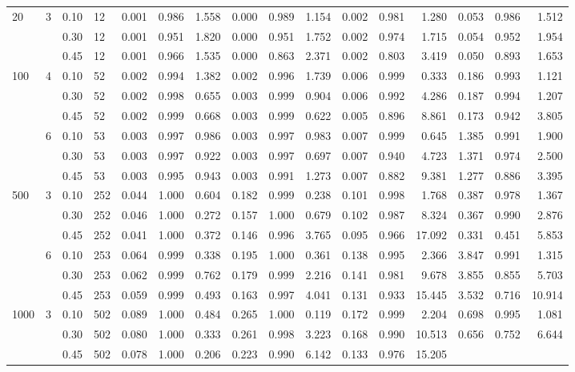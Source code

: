 \documentclass[thesis=B,english]{FITthesis}[2012/10/20]
\begin{document}
\begin{table}[h!]
\begin{adjustbox}{angle=90}
{\begin{tabular}{ll|l|l|r|r|r|r|r|r|r|r|r|r|r|r|}
                       20   & 3 & 0.10 & 12  &    0.001 &  0.986 &  1.558 &   0.000 &  0.989 &  1.154 &  0.002 &  0.981 &   1.280 &  0.053 &  0.986 &   1.512 \\     &   & 0.30 & 12  &    0.001 &  0.951 &  1.820 &   0.000 &  0.951 &  1.752 &  0.002 &  0.974 &   1.715 &  0.054 &  0.952 &   1.954 \\     &   & 0.45 & 12  &    0.001 &  0.966 &  1.535 &   0.000 &  0.863 &  2.371 &  0.002 &  0.803 &   3.419 &  0.050 &  0.893 &   1.653 \\100  & 4 & 0.10 & 52  &    0.002 &  0.994 &  1.382 &   0.002 &  0.996 &  1.739 &  0.006 &  0.999 &   0.333 &  0.186 &  0.993 &   1.121 \\     &   & 0.30 & 52  &    0.002 &  0.998 &  0.655 &   0.003 &  0.999 &  0.904 &  0.006 &  0.992 &   4.286 &  0.187 &  0.994 &   1.207 \\     &   & 0.45 & 52  &    0.002 &  0.999 &  0.668 &   0.003 &  0.999 &  0.622 &  0.005 &  0.896 &   8.861 &  0.173 &  0.942 &   3.805 \\     & 6 & 0.10 & 53  &    0.003 &  0.997 &  0.986 &   0.003 &  0.997 &  0.983 &  0.007 &  0.999 &   0.645 &  1.385 &  0.991 &   1.900 \\     &   & 0.30 & 53  &    0.003 &  0.997 &  0.922 &   0.003 &  0.997 &  0.697 &  0.007 &  0.940 &   4.723 &  1.371 &  0.974 &   2.500 \\     &   & 0.45 & 53  &    0.003 &  0.995 &  0.943 &   0.003 &  0.991 &  1.273 &  0.007 &  0.882 &   9.381 &  1.277 &  0.886 &   3.395 \\500  & 3 & 0.10 & 252 &    0.044 &  1.000 &  0.604 &   0.182 &  0.999 &  0.238 &  0.101 &  0.998 &   1.768 &  0.387 &  0.978 &   1.367 \\     &   & 0.30 & 252 &    0.046 &  1.000 &  0.272 &   0.157 &  1.000 &  0.679 &  0.102 &  0.987 &   8.324 &  0.367 &  0.990 &   2.876 \\     &   & 0.45 & 252 &    0.041 &  1.000 &  0.372 &   0.146 &  0.996 &  3.765 &  0.095 &  0.966 &  17.092 &  0.331 &  0.451 &   5.853 \\     & 6 & 0.10 & 253 &    0.064 &  0.999 &  0.338 &   0.195 &  1.000 &  0.361 &  0.138 &  0.995 &   2.366 &  3.847 &  0.991 &   1.315 \\     &   & 0.30 & 253 &    0.062 &  0.999 &  0.762 &   0.179 &  0.999 &  2.216 &  0.141 &  0.981 &   9.678 &  3.855 &  0.855 &   5.703 \\     &   & 0.45 & 253 &    0.059 &  0.999 &  0.493 &   0.163 &  0.997 &  4.041 &  0.131 &  0.933 &  15.445 &  3.532 &  0.716 &  10.914 \\1000 & 3 & 0.10 & 502 &    0.089 &  1.000 &  0.484 &   0.265 &  1.000 &  0.119 &  0.172 &  0.999 &   2.204 &  0.698 &  0.995 &   1.081 \\     &   & 0.30 & 502 &    0.080 &  1.000 &  0.333 &   0.261 &  0.998 &  3.223 &  0.168 &  0.990 &  10.513 &  0.656 &  0.752 &   6.644 \\     &   & 0.45 & 502 &    0.078 &  1.000 &  0.206 &   0.223 &  0.990 &  6.142 &  0.133 &  0.976 &  15.205 &  
\end{tabular}}
\end{adjustbox}
\end{table}
\end{document}
